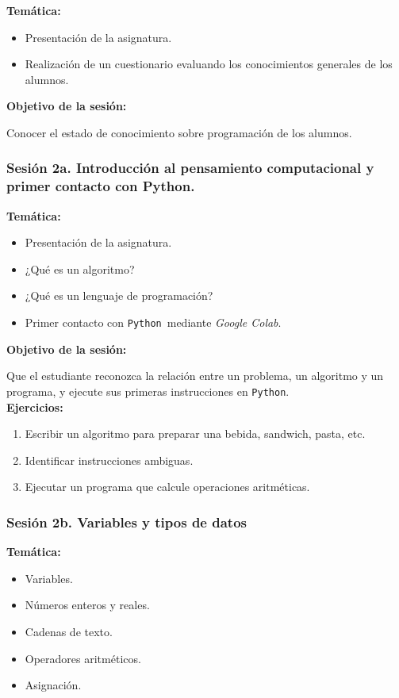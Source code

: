 \documentclass[12pt,letterpaper]{article}
\newcommand{\python}{\texttt{Python}}
\newcommand{\colab}{\textit{Google Colab}}
\begin{document}
\textbf{Temática:}
\begin{itemize}[noitemsep]
    \item Presentación de la asignatura.
    \item Realización de un cuestionario evaluando los conocimientos generales de los alumnos.   
\end{itemize}

\textbf{Objetivo de la sesión:}

Conocer el estado de conocimiento sobre programación de los alumnos. 


\subsubsection*{Sesión 2a. Introducción al pensamiento computacional y primer contacto con Python.}

\textbf{Temática:}
\begin{itemize}[noitemsep]
    \item Presentación de la asignatura.
    \item ¿Qué es un algoritmo?
    \item ¿Qué es un lenguaje de programación?
    \item Primer contacto con \python\ mediante \colab.
\end{itemize}

\textbf{Objetivo de la sesión:}

Que el estudiante reconozca la relación entre un problema, un algoritmo
y un programa, y ejecute sus primeras instrucciones en \python.\\

\textbf{Ejercicios:}
\begin{enumerate}[noitemsep]
    \item Escribir un algoritmo para preparar una bebida, sandwich, pasta, etc.
    \item Identificar instrucciones ambiguas.
    \item Ejecutar un programa que calcule operaciones aritméticas.
\end{enumerate}

\subsubsection*{Sesión 2b. Variables y tipos de datos}

\textbf{Temática:}
\begin{itemize}[noitemsep]
    \item Variables.
    \item Números enteros y reales.
    \item Cadenas de texto.
    \item Operadores aritméticos.
    \item Asignación.
\end{itemize}
\end{document}
